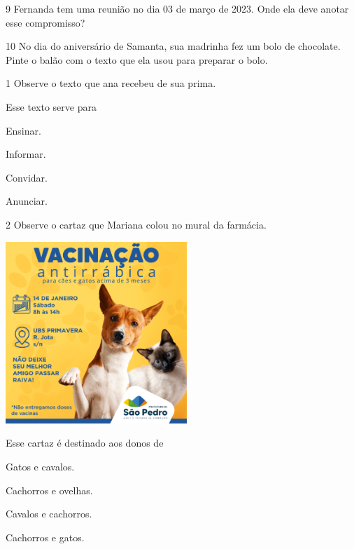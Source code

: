 \num{9} Fernanda tem uma reunião no dia 03 de março de 2023. Onde ela
deve anotar esse compromisso?


\num{10} No dia do aniversário de Samanta, sua madrinha fez um bolo de
chocolate. Pinte o balão com o texto que ela usou para preparar o bolo.



\num{1} Observe o texto que ana recebeu de sua prima.


Esse texto serve para

\begin{escolha}
	\item Ensinar.

	\item Informar.

	\item Convidar.

	\item Anunciar.
\end{escolha}

\num{2} Observe o cartaz que Mariana colou no mural da farmácia.

\includegraphics[width=2.70149in,height=2.70149in]{media/image115.png}

Esse cartaz é destinado aos donos de 

\begin{escolha}
	\item Gatos e cavalos.

	\item Cachorros e ovelhas.

	\item Cavalos e cachorros.

	\item Cachorros e gatos.
\end{escolha}

